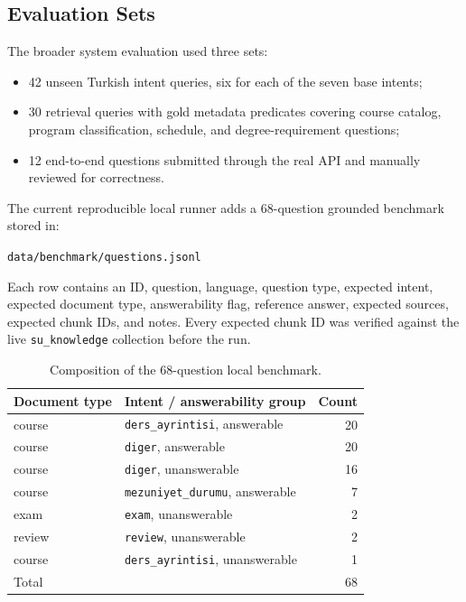 \documentclass[10pt,a4paper]{article}
\newcommand{\code}[1]{\texttt{\small #1}}
\begin{document}
\subsection{Evaluation Sets}

The broader system evaluation used three sets:
\begin{itemize}
    \item 42 unseen Turkish intent queries, six for each of the seven base intents;
    \item 30 retrieval queries with gold metadata predicates covering course catalog, program classification, schedule, and degree-requirement questions;
    \item 12 end-to-end questions submitted through the real API and manually reviewed for correctness.
\end{itemize}

The current reproducible local runner adds a 68-question grounded benchmark stored in:
\begin{center}
{\scriptsize\code{data/benchmark/questions.jsonl}}
\end{center}
Each row contains an ID, question, language, question type, expected intent, expected document type, answerability flag, reference answer, expected sources, expected chunk IDs, and notes. Every expected chunk ID was verified against the live \code{su\_knowledge} collection before the run.

\begin{table}[H]
\centering
\caption{Composition of the 68-question local benchmark.}
\label{tab:benchmark}
\small
\begin{tabularx}{\linewidth}{llr}
\toprule
\textbf{Document type} & \textbf{Intent / answerability group} & \textbf{Count}\\
\midrule
course & \code{ders\_ayrintisi}, answerable & 20\\
course & \code{diger}, answerable & 20\\
course & \code{diger}, unanswerable & 16\\
course & \code{mezuniyet\_durumu}, answerable & 7\\
exam & \code{exam}, unanswerable & 2\\
review & \code{review}, unanswerable & 2\\
course & \code{ders\_ayrintisi}, unanswerable & 1\\
\midrule
Total & & 68\\
\bottomrule
\end{tabularx}
\end{table}
\end{document}
